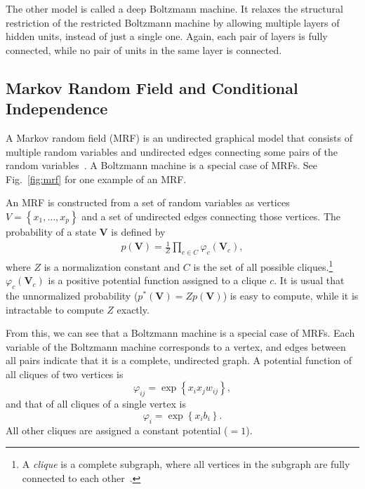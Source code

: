 \documentclass{now}
\newcommand{\matr}[1]{\mathbf{#1}}
\newcommand{\mV}[0]{\matr{V}}
\begin{document}
The other model is called a deep Boltzmann machine. It relaxes the structural
restriction of the restricted Boltzmann machine by allowing multiple layers of
hidden units, instead of just a single one. Again, each pair of layers is fully
connected, while no pair of units in the same layer is connected.


\subsection{Markov Random Field and Conditional Independence}
\label{sec:mrf}

A Markov random field (MRF) is an
undirected graphical model that consists of multiple random variables and
undirected edges connecting some pairs of the random variables~\citep[see,
e.g.,][]{Kindermann1980}. A Boltzmann machine is a special case of MRFs. See
Fig.~\ref{fig:mrf} for one example of an MRF.

An MRF is constructed from a set of random variables as vertices $V=\left\{ x_1,
\dots, x_p \right\}$ and a set of undirected edges connecting those vertices.
The probability of a state $\mV$ is defined by 
\begin{align*}
    p(\mV) = \frac{1}{Z} \prod_{c \in C} \varphi_c
    \left(\mV_c\right),
\end{align*}
where $Z$ is a normalization constant and $C$ is the set of all possible
cliques.\footnote{
    A \textit{clique} is a complete subgraph, where all vertices in the subgraph
    are fully connected to each other~\citep[see, e.g.,][]{Bondy2008}.
}
$\varphi_c\left(\mV_c\right)$ is a positive potential function assigned to a
clique $c$. It is usual that the unnormalized probability ($p^*(\mV) = Z
p(\mV)$) is easy to compute, while it is intractable to compute $Z$ exactly.

From this, we can see that a Boltzmann machine is a special case of MRFs. Each
variable of the Boltzmann machine corresponds to a vertex, and edges between all
pairs indicate that it is a complete, undirected graph. A potential function of
all cliques of two vertices is
\[
\varphi_{ij} = \exp \left\{ x_i x_j w_{ij} \right\},
\]
and that of all cliques of a single vertex is
\[
\varphi_{i} = \exp \left\{ x_i b_i \right\}.
\]
All other cliques are assigned a constant potential ($=1$).
\end{document}
